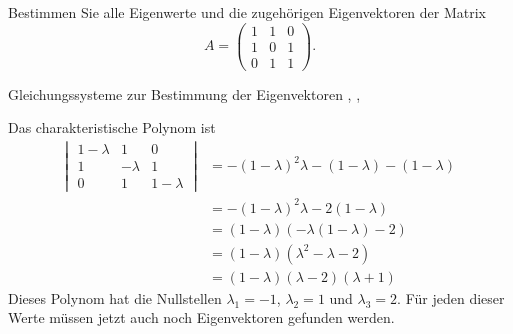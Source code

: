 Bestimmen Sie alle Eigenwerte und die zugehörigen Eigenvektoren der Matrix
\[
A=\begin{pmatrix}
1&1&0\\
1&0&1\\
0&1&1
\end{pmatrix}.
\]
\begin{hinweis}
Gleichungssysteme zur Bestimmung der Eigenvektoren
,
,
\end{hinweis}



\begin{loesung}
Das charakteristische Polynom ist
\begin{align*}
\left|\;\begin{matrix}
1-\lambda&1&0\\
1&-\lambda&1\\
0&1&1-\lambda
\end{matrix}\;\right|
&=
-(1-\lambda)^2\lambda-(1-\lambda)-(1-\lambda)\\
&=
-(1-\lambda)^2\lambda-2(1-\lambda)\\
&=
(1-\lambda)(-\lambda(1-\lambda)-2)\\
&=
(1-\lambda)(\lambda^2-\lambda-2)\\
&=
(1-\lambda)(\lambda -2 )(\lambda+1)
\end{align*}
Dieses Polynom hat die Nullstellen $\lambda_1=-1$, $\lambda_2=1$
und $\lambda_3=2$. Für jeden dieser Werte müssen jetzt auch noch
Eigenvektoren gefunden werden.


\end{loesung}
